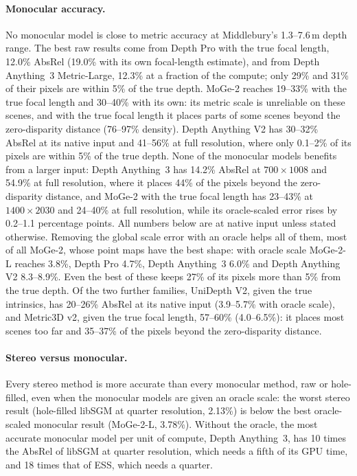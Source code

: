 \documentclass[10pt,twocolumn]{article}
\begin{document}
\paragraph{Monocular accuracy.} No monocular model is close to metric accuracy at Middlebury's
1.3--7.6\,m depth range. The best raw results come from Depth Pro with the true focal length, 12.0\%
AbsRel (19.0\% with its own focal-length estimate), and from Depth Anything~3 Metric-Large, 12.3\% at a
fraction of the compute; only 29\% and 31\% of their pixels are within 5\% of the true depth. MoGe-2
reaches 19--33\% with the true focal length and 30--40\% with its own: its metric scale is unreliable
on these scenes, and with the true focal length it places parts of some scenes beyond the
zero-disparity distance (76--97\% density). Depth Anything V2 has 30--32\% AbsRel at its native input
and 41--56\% at full resolution, where only 0.1--2\% of its pixels are within 5\% of the true depth.
None of the monocular models benefits from a larger input: Depth Anything~3 has 14.2\% AbsRel at
$700\times1008$ and 54.9\% at full resolution, where it places 44\% of the pixels beyond the
zero-disparity distance, and MoGe-2 with the true focal length has 23--43\% at $1400\times2030$ and
24--40\% at full resolution, while its oracle-scaled error rises by 0.2--1.1 percentage points. All
numbers below are at native input unless stated otherwise. Removing the global scale error with an
oracle helps all of them, most of all MoGe-2, whose point maps have the best shape: with oracle scale
MoGe-2-L reaches 3.8\%, Depth Pro 4.7\%, Depth Anything~3 6.0\% and Depth Anything V2 8.3--8.9\%. Even
the best of these keeps 27\% of its pixels more than 5\% from the true depth. Of the two further
families, UniDepth V2, given the true intrinsics, has 20--26\% AbsRel at its native input (3.9--5.7\%
with oracle scale), and Metric3D v2, given the true focal length, 57--60\% (4.0--6.5\%): it places
most scenes too far and 35--37\% of the pixels beyond the zero-disparity distance.

\paragraph{Stereo versus monocular.} Every stereo method is more accurate than every monocular method,
raw or hole-filled, even when the monocular models are given an oracle scale: the worst stereo result
(hole-filled libSGM at quarter resolution, 2.13\%) is below the best oracle-scaled monocular result
(MoGe-2-L, 3.78\%). Without the oracle, the most accurate monocular model per unit of compute, Depth
Anything~3, has 10 times the AbsRel of libSGM at quarter resolution, which needs a fifth of its GPU
time, and 18 times that of ESS, which needs a quarter.
\end{document}
